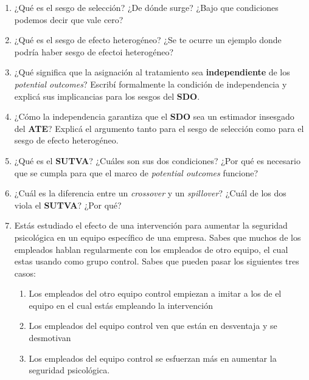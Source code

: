 \documentclass[
  letterpaper,
  DIV=11,
  numbers=noendperiod,
  oneside]{scrreprt}
\providecommand{\tightlist}{%
  \setlength{\itemsep}{0pt}\setlength{\parskip}{0pt}}\usepackage{longtable,booktabs,array}
\begin{document}
\begin{enumerate}
  \begin{enumerate}
  \def\labelenumii{\alph{enumii}.}
  \tightlist
  \item
    ¿Qué estás calculando al comparar los promedios observados entre
    quienes usan y no usan el dispositivo?
  \item
    ¿Eso coincide necesariamente con el ATE?¿Por qué?
  \item
    A partir de esta información, ¿Podés concluir que el dispositivo
    empeora la audición?¿Por qué?
  \end{enumerate}
\item
  ¿Qué es el sesgo de selección? ¿De dónde surge? ¿Bajo que condiciones
  podemos decir que vale cero?
\item
  ¿Qué es el sesgo de efecto heterogéneo? ¿Se te ocurre un ejemplo donde
  podría haber sesgo de efectoi heterogéneo?
\item
  ¿Qué significa que la asignación al tratamiento sea
  \textbf{independiente} de los \emph{potential outcomes}? Escribí
  formalmente la condición de independencia y explicá sus implicancias
  para los sesgos del \textbf{SDO}.
\item
  ¿Cómo la independencia garantiza que el \textbf{SDO} sea un estimador
  insesgado del \textbf{ATE}? Explicá el argumento tanto para el sesgo
  de selección como para el sesgo de efecto heterogéneo.
\item
  ¿Qué es el \textbf{SUTVA}? ¿Cuáles son sus dos condiciones? ¿Por qué
  es necesario que se cumpla para que el marco de \emph{potential
  outcomes} funcione?
\item
  ¿Cuál es la diferencia entre un \emph{crossover} y un
  \emph{spillover}? ¿Cuál de los dos viola el \textbf{SUTVA}? ¿Por qué?
\item
  Estás estudiado el efecto de una intervención para aumentar la
  seguridad psicológica en un equipo específico de una empresa. Sabes
  que muchos de los empleados hablan regularmente con los empleados de
  otro equipo, el cual estas usando como grupo control. Sabes que pueden
  pasar los siguientes tres casos:

  \begin{enumerate}
  \def\labelenumii{\roman{enumii}.}
  \tightlist
  \item
    Los empleados del otro equipo control empiezan a imitar a los de el
    equipo en el cual estás empleando la intervención
  \item
    Los empleados del equipo control ven que están en desventaja y se
    desmotivan
  \item
    Los empleados del equipo control se esfuerzan más en aumentar la
    seguridad psicológica.
  \end{enumerate}
\end{enumerate}
\end{document}
